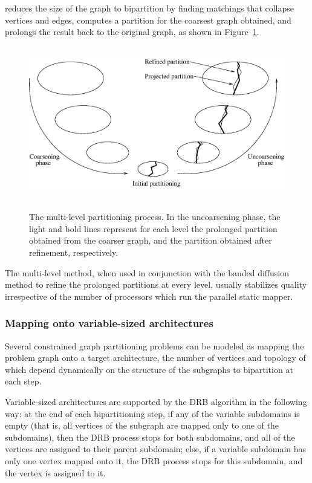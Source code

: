 \begin{itemize}
reduces the size of the graph to bipartition by finding matchings that
collapse vertices and edges, computes a partition for the coarsest
graph obtained, and prolongs the result back to the original graph,
as shown in Figure~\ref{fig-multiproc}.
\begin{figure}[hbt]
~\hfill\includegraphics[scale=0.50]{s_f_mult.eps}\hfill\ ~
\caption%
{The multi-level partitioning process. In the uncoarsening phase, the light
and bold lines represent for each level the prolonged partition obtained
from the coarser graph, and the partition obtained after refinement,
respectively.}
\label{fig-multiproc}
\end{figure}
The multi-level method, when used in conjunction with the banded
diffusion method to refine the prolonged partitions at every level,
usually stabilizes quality irrespective of the number of processors
which run the parallel static mapper.
\end{itemize}

\subsubsection{Mapping onto variable-sized architectures}
\label{sec-algo-variable}

Several constrained graph partitioning problems can be modeled as
mapping the problem graph onto a target architecture, the number of
vertices and topology of which depend dynamically on the structure of
the subgraphs to bipartition at each step.

Variable-sized architectures are supported by the DRB algorithm in the
following way: at the end of each bipartitioning step, if any of the
variable subdomains is empty (that is, all vertices of the subgraph
are mapped only to one of the subdomains), then the DRB process stops
for both subdomains, and all of the vertices are assigned to their
parent subdomain; else, if a variable subdomain has only one vertex
mapped onto it, the DRB process stops for this subdomain, and the
vertex is assigned to it.

